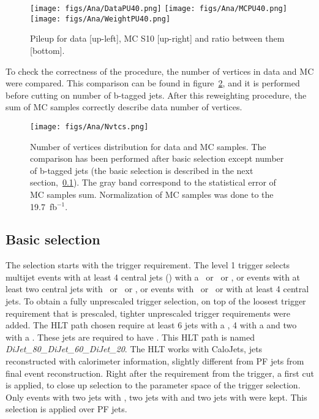 \begin{figure}[!Hhtbp]
  \begin{center}
    \texttt{[image: figs/Ana/DataPU40.png]}
    \texttt{[image: figs/Ana/MCPU40.png]}
    \texttt{[image: figs/Ana/WeightPU40.png]}
    \caption{Pileup for data [up-left], MC S10 [up-right] and ratio between them [bottom].}
    \label{fig:PU_distros}
  \end{center}
\end{figure}

To check the correctness of the procedure, the number of vertices in data and MC were compared. This comparison can be found in figure~\ref{fig:NV_dataMC}, and it is performed before cutting on number of b-tagged jets. After this reweighting procedure, the sum of MC samples correctly describe data number of vertices.

\begin{figure}[!Hhtbp]
  \begin{center}
    \texttt{[image: figs/Ana/Nvtcs.png]}
    \caption{Number of vertices distribution for data and MC samples. The comparison has been performed after basic selection except number of b-tagged jets (the basic selection is described in the next section,~\ref{sec:basicsel}). The gray band correspond to the statistical error of MC samples sum. Normalization of MC samples was done to the 19.7~fb$^{-1}$.}
    \label{fig:NV_dataMC}
  \end{center}
\end{figure}

\subsection{Basic selection}
\label{sec:basicsel}

The selection starts with the trigger requirement. The level 1 trigger selects multijet events with at least 4 central jets () with a ~or ~or , or events with at least two central jets with ~or ~or , or events with ~or ~or  with at least 4 central jets. To obtain a fully unprescaled trigger selection, on top of the loosest trigger requirement that is prescaled, tighter unprescaled trigger requirements were added. The HLT path chosen require at least 6 jets with a , 4 with a  and two with a . These jets are required to have . This HLT path is named \textit{DiJet\_80\_DiJet\_60\_DiJet\_20}. The HLT works with CaloJets, jets reconstructed with calorimeter information, slightly different from PF jets from final event reconstruction. Right after the requirement from the trigger, a first cut is applied, to close up selection to the parameter space of the trigger selection. Only events with two jets with , two jets with  and two jets with  were kept. This selection is applied over PF jets. %

